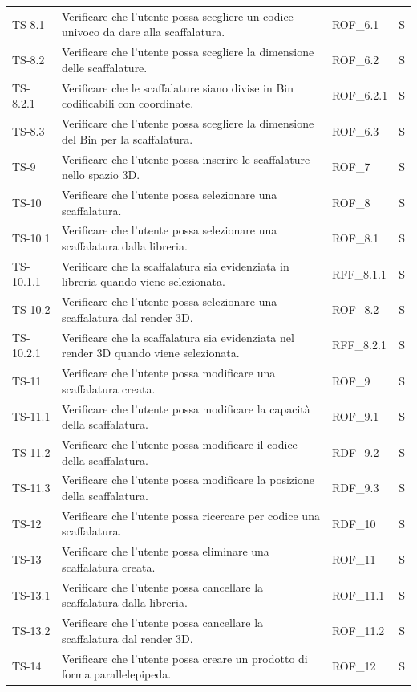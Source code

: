 \begin{xltabular}{0.9\textwidth}{X | p{0.5\textwidth} | X | p{0.9cm}}
    TS-8.1 & Verificare che l'utente possa scegliere un codice univoco da dare alla scaffalatura. & ROF\_6.1& S\\
    TS-8.2 &Verificare che l'utente possa scegliere la dimensione delle scaffalature. & ROF\_6.2& S\\
    TS-8.2.1& Verificare che le scaffalature siano divise in Bin codificabili con coordinate. & ROF\_6.2.1& S\\
    TS-8.3 & Verificare che l'utente possa scegliere la dimensione del Bin per la scaffalatura. & ROF\_6.3& S\\
    TS-9 & Verificare che l'utente possa inserire le scaffalature nello spazio 3D. & ROF\_7& S\\
    TS-10 & Verificare che l'utente possa selezionare una scaffalatura. & ROF\_8& S \\
    TS-10.1 & Verificare che l'utente possa selezionare una scaffalatura dalla libreria. & ROF\_8.1& S\\
    TS-10.1.1 &  Verificare che la scaffalatura sia evidenziata in libreria quando viene selezionata. & RFF\_8.1.1& S\\
    TS-10.2 & Verificare che l'utente possa selezionare una scaffalatura dal render 3D. & ROF\_8.2& S\\
    TS-10.2.1 & Verificare che la scaffalatura sia evidenziata nel render 3D quando viene selezionata. & RFF\_8.2.1& S\\
    TS-11 & Verificare che l'utente possa modificare una scaffalatura creata. & ROF\_9& S\\
    TS-11.1 & Verificare che l'utente possa modificare la capacità della scaffalatura. & ROF\_9.1& S\\
    TS-11.2 & Verificare che l'utente possa modificare il codice della scaffalatura. & RDF\_9.2& S \\
    TS-11.3 & Verificare che l'utente possa modificare la posizione della scaffalatura. & RDF\_9.3 & S \\
    TS-12 & Verificare che l'utente possa ricercare per codice una scaffalatura. & RDF\_10& S\\
    TS-13 & Verificare che l'utente possa eliminare una scaffalatura creata. &  ROF\_11& S\\
    TS-13.1 & Verificare che l'utente possa cancellare la scaffalatura dalla libreria.& ROF\_11.1 & S\\
    TS-13.2& Verificare che l'utente possa cancellare la scaffalatura dal render 3D. & ROF\_11.2& S\\
    TS-14 & Verificare che l'utente possa creare un prodotto di forma parallelepipeda. & ROF\_12& S \\

\end{xltabular}
